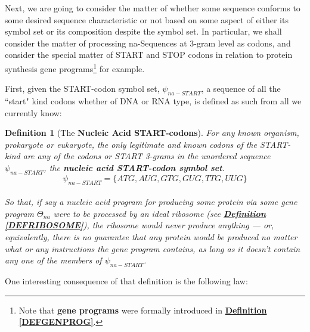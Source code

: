 \documentclass[a4paper, 18pt]{book} %
\newtheorem{defn}{Definition}
\begin{document}
Next, we are going to consider the matter of whether some sequence conforms to some desired sequence characteristic or not based on some aspect of either its symbol set or its composition despite the symbol set. In particular, we shall consider the matter of processing na-Sequences at 3-gram level as codons, and consider the special matter of START and STOP codons in relation to protein synthesis gene programs\footnote{Note that \textbf{gene programs} were formally introduced in \textbf{\hyperref[DEFGENPROG]{Definition \ref{DEFGENPROG}}}.} for example.


First, given the START-codon symbol set, $\psi_{na-START}$, a sequence of all the ``start" kind codons whether of DNA or RNA type, is defined as such from all we currently know:

\begin{defn}[The \textbf{Nucleic Acid START-codons}]
\label{DEFSTARTCOD}
For any known organism, prokaryote or eukaryote, the only legitimate and known codons of the START-kind are any of the codons or START 3-grams in the unordered sequence $\psi_{na-START}$, the \textbf{nucleic acid START-codon symbol set}.\\

\begin{equation}
\label{EQNNASSS}
\psi_{na-START} = \{ATG,AUG,GTG,GUG,TTG,UUG\}
\end{equation}\\

    So that, if say a nucleic acid program for producing some protein via some gene program $\Theta_{na}$ were to be processed by an ideal ribosome (see \textbf{\hyperref[DEFRIBOSOME]{Definition \ref{DEFRIBOSOME}}}), the ribosome would never produce anything --- or, equivalently, there is no guarantee that any protein would be produced no matter what or any instructions the gene program contains, as long as it doesn't contain any one of the members of $\psi_{na-START}$.
\end{defn} 

One interesting consequence of that definition is the following law:\\
\end{document}
